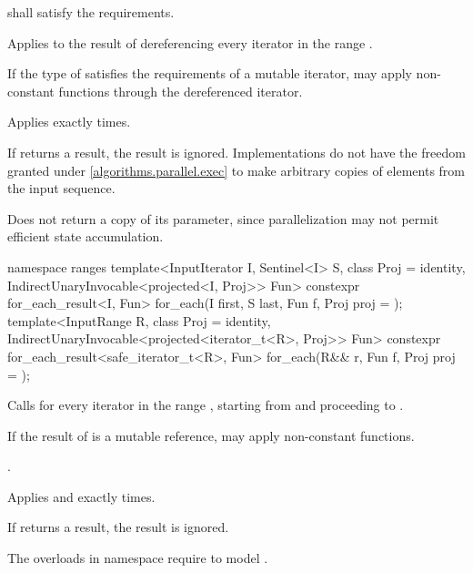 \begin{itemdescr}
\pnum
\requires
{} shall satisfy the  requirements.

\pnum
\effects
Applies  to the result of dereferencing
every iterator in the range .
\begin{note}
If the type of  satisfies the requirements of a mutable iterator,
 may apply non-constant functions through the dereferenced iterator.
\end{note}

\pnum
\complexity
Applies  exactly  times.

\pnum
\remarks
If  returns a result, the result is ignored.
Implementations do not have
the freedom granted under \ref{algorithms.parallel.exec}
to make arbitrary copies of elements from the input sequence.

\pnum
\begin{note}
Does not return a copy of its  parameter,
since parallelization may not permit efficient state accumulation.
\end{note}
\end{itemdescr}

%
\begin{itemdecl}
namespace ranges {
  template<InputIterator I, Sentinel<I> S, class Proj = identity,
           IndirectUnaryInvocable<projected<I, Proj>> Fun>
    constexpr for_each_result<I, Fun>
      for_each(I first, S last, Fun f, Proj proj = {});
  template<InputRange R, class Proj = identity,
           IndirectUnaryInvocable<projected<iterator_t<R>, Proj>> Fun>
    constexpr for_each_result<safe_iterator_t<R>, Fun>
      for_each(R&& r, Fun f, Proj proj = {});
}
\end{itemdecl}

\begin{itemdescr}
\pnum
\effects
Calls 
for every iterator  in the range ,
starting from  and proceeding to .
\begin{note}
If the result of  is a mutable reference,
 may apply non-constant functions.
\end{note}

\pnum
\returns
{}.

\pnum
\complexity
Applies  and  exactly  times.

\pnum
\remarks
If  returns a result, the result is ignored.

\pnum
\begin{note}
The overloads in namespace  require
 to model .
\end{note}
\end{itemdescr}

